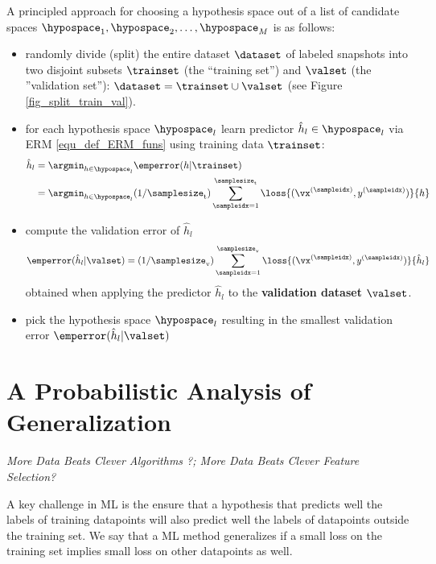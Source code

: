\documentclass[12pt]{report}
\begin{document}
A principled approach for choosing a hypothesis space out of a  
list of candidate spaces $\hypospace_{1},\hypospace_{2},\ldots,\hypospace_{M}$ 
is as follows: 
\begin{itemize} 
\item randomly divide (split) the entire dataset $\dataset$ of labeled snapshots into two disjoint subsets 
$\trainset$ (the ``training set'') and $\valset$ (the ''validation set''): 
$\dataset = \trainset \cup \valset$ (see Figure \ref{fig_split_train_val}). 
\item for each hypothesis space $\hypospace_{l}$ learn predictor $\hat{h}_{l} \in \hypospace_{l}$ via ERM \eqref{equ_def_ERM_funs} using training data $\trainset$:
\begin{align} 
\label{equ_def_hat_h_fitting_sel}
\hat{h}_{l} & = \argmin_{h \in \hypospace_{l}} \emperror(h| \trainset) \nonumber \\
& = \argmin_{h \in \hypospace_{l}}  (1/\samplesize_{\rm t}) \sum_{\sampleidx=1}^{\samplesize_{\rm t}} \loss{(\vx^{(\sampleidx)},y^{(\sampleidx)})}{h} %
\end{align} 
\item compute the validation error of $\hat{h}_{l}$ 
\begin{equation} 
\label{equ_def_training_val_val_modsel}
\emperror(\hat{h}_{l}|\valset) = (1/\samplesize_{\rm v}) \sum_{\sampleidx=1}^{\samplesize_{\rm v}} \loss{(\vx^{(\sampleidx)},y^{(\sampleidx)})} {\hat{h}_{l}}  %
\end{equation}  
obtained when applying the predictor $\hat{h}_{l}$ to the {\bf validation dataset} $\valset$. 
\item pick the hypothesis space $\hypospace_{l}$ resulting in the smallest validation error $\emperror(\hat{h}_{l}|\valset)$
\end{itemize} 



\section{A Probabilistic Analysis of Generalization} 
\label{sec_gen_linreg}
\emph{More Data Beats Clever Algorithms ?; More Data Beats Clever Feature Selection?}

A key challenge in ML is the ensure that a hypothesis that predicts well 
the labels of training datapoints will also predict well the labels of datapoints 
outside the training set. We say that a ML method generalizes if a small 
loss on the training set implies small loss on other datapoints as well. 
\end{document}
